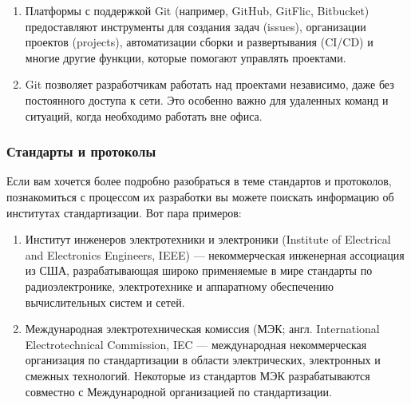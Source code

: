 \documentclass[letterpaper,10pt,russian]{sphinxmanual}
\begin{document}
\begin{enumerate}
\item {} 
\sphinxAtStartPar
{} Платформы с поддержкой Git (например, GitHub, GitFlic, Bitbucket) предоставляют инструменты для создания задач (issues), организации проектов (projects), автоматизации сборки и развертывания (CI/CD) и многие другие функции, которые помогают управлять проектами.

\item {} 
\sphinxAtStartPar
{} Git позволяет разработчикам работать над проектами независимо, даже без постоянного доступа к сети. Это особенно важно для удаленных команд и ситуаций, когда необходимо работать вне офиса.

\end{enumerate}


\subsubsection{Стандарты и протоколы}
\label{\detokenize{educational_materials/team_work_on_a_gitflic/content:id4}}
\sphinxAtStartPar
Если вам хочется более подробно разобраться в теме стандартов и протоколов, познакомиться с процессом их разработки \sphinxhyphen{} вы можете поискать информацию об институтах стандартизации. Вот пара примеров:
\begin{enumerate}
%
\item {} 
\sphinxAtStartPar
Институт инженеров электротехники и электроники (Institute of Electrical and Electronics Engineers, IEEE) — некоммерческая инженерная ассоциация из США, разрабатывающая широко применяемые в мире стандарты по радиоэлектронике, электротехнике и аппаратному обеспечению вычислительных систем и сетей.

\item {} 
\sphinxAtStartPar
Международная электротехническая комиссия (МЭК; англ. International Electrotechnical Commission, IEC — международная некоммерческая организация по стандартизации в области электрических, электронных и смежных технологий. Некоторые из стандартов МЭК разрабатываются совместно с Международной организацией по стандартизации.

\end{enumerate}
\end{document}

